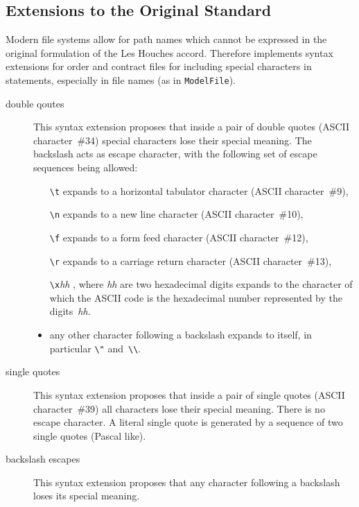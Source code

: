 \subsection{\gosam{} Extensions to the Original Standard}
\label{sec:olp:extensions}
Modern file systems allow for path names which cannot be expressed in
the original formulation of the Les Houches accord. Therefore \gosamv{}
implements syntax extensions for order and contract files for including
special characters in statements, especially in file names (as in
\lstinline!ModelFile!).

\begin{description}
\item[double qoutes] This syntax extension proposes that inside a pair
   of double quotes (ASCII character~\#34) special characters lose their
   special meaning. The backslash acts as escape character, with the following
   set of escape sequences being allowed:
   \begin{itemize}
   \item[\texttt{\textbackslash t}] expands to a horizontal tabulator
        character (ASCII character~\#9),
   \item[\texttt{\textbackslash n}] expands to a new line character
   	(ASCII character~\#10),
   \item[\texttt{\textbackslash f}] expands to a form feed character
   	(ASCII character~\#12),
   \item[\texttt{\textbackslash r}] expands to a carriage return character
   	(ASCII character~\#13),
   \item[\texttt{\textbackslash x}\textit{hh}], where \textit{hh} are two
        hexadecimal digits expands to the character of which the
        ASCII code is the hexadecimal number represented by the
	digits~\textit{hh}.
   \item any other character following a backslash expands to itself,
        in particular \texttt{\textbackslash"}
	and~\texttt{\textbackslash\textbackslash}.
   \end{itemize}
\item[single quotes] This syntax extension proposes that inside a pair
   of single quotes (ASCII character~\#39) all characters lose their
   special meaning. There is no escape character. A literal single quote
   is generated by a sequence of two single quotes (Pascal like).
\item[backslash escapes] This syntax extension proposes that any character
   following a backslash loses its special meaning.
\end{description}

